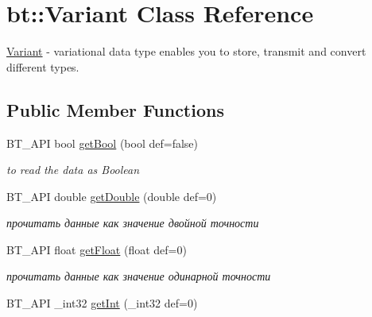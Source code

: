 \hypertarget{classbt_1_1_variant}{\section{bt\-:\-:Variant Class Reference}
\label{classbt_1_1_variant}
}


\hyperlink{classbt_1_1_variant}{Variant} -\/ variational data type enables you to store, transmit and convert different types.  


\subsection*{Public Member Functions}
\begin{DoxyCompactItemize}
\item 
\hypertarget{classbt_1_1_variant_a5afa87a6a66ed8e65842edec91a6692d}{B\-T\-\_\-\-A\-P\-I bool \hyperlink{classbt_1_1_variant_a5afa87a6a66ed8e65842edec91a6692d}{get\-Bool} (bool def=false)}\label{classbt_1_1_variant_a5afa87a6a66ed8e65842edec91a6692d}

\begin{DoxyCompactList}\small\item\em to read the data as Boolean \end{DoxyCompactList}\item 
\hypertarget{classbt_1_1_variant_ab1c463d8897d6de4338ca1dec155e48b}{B\-T\-\_\-\-A\-P\-I double \hyperlink{classbt_1_1_variant_ab1c463d8897d6de4338ca1dec155e48b}{get\-Double} (double def=0)}\label{classbt_1_1_variant_ab1c463d8897d6de4338ca1dec155e48b}

\begin{DoxyCompactList}\small\item\em прочитать данные как значение двойной точности \end{DoxyCompactList}\item 
\hypertarget{classbt_1_1_variant_a3c4b3f571cf514fdcda513f56eb5c78e}{B\-T\-\_\-\-A\-P\-I float \hyperlink{classbt_1_1_variant_a3c4b3f571cf514fdcda513f56eb5c78e}{get\-Float} (float def=0)}\label{classbt_1_1_variant_a3c4b3f571cf514fdcda513f56eb5c78e}

\begin{DoxyCompactList}\small\item\em прочитать данные как значение одинарной точности \end{DoxyCompactList}\item 
\hypertarget{classbt_1_1_variant_a7179e2be7b4afef1f9f1abfdb0284799}{B\-T\-\_\-\-A\-P\-I \-\_\-int32 \hyperlink{classbt_1_1_variant_a7179e2be7b4afef1f9f1abfdb0284799}{get\-Int} (\-\_\-int32 def=0)}\label{classbt_1_1_variant_a7179e2be7b4afef1f9f1abfdb0284799}


\end{DoxyCompactItemize}
